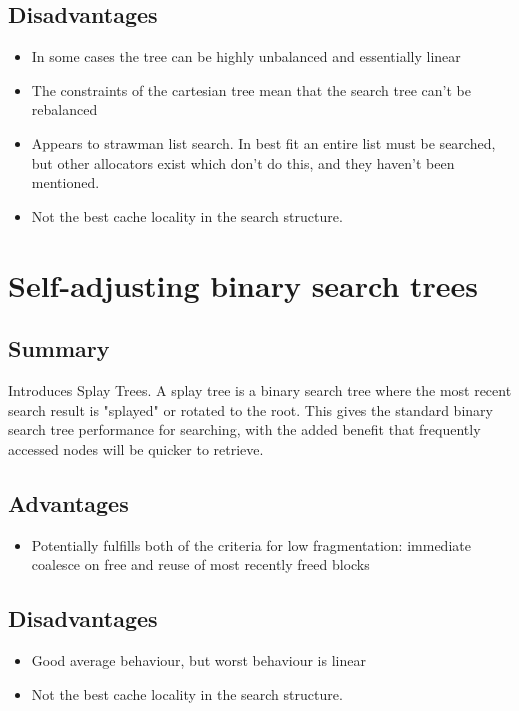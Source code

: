 \documentclass{report}
\begin{document}
\subsection{Disadvantages}
\begin{itemize}
	\item{In some cases the tree can be highly unbalanced and essentially linear}
	\item{The constraints of the cartesian tree mean that the search tree can't be rebalanced}
	\item{Appears to strawman list search. In best fit an entire list must be searched, but other allocators exist which don't do this, and they haven't been mentioned.}
	\item{Not the best cache locality in the search structure.}
\end{itemize}

\section[Splay Trees]{Self-adjusting binary search trees \cite{10.1145/3828.3835}}
\subsection{Summary}
Introduces Splay Trees. A splay tree is a binary search tree where the most recent search result is "splayed" or rotated to the root. This gives the standard binary search tree performance for searching, with the added benefit that frequently accessed nodes will be quicker to retrieve.
\subsection{Advantages}
\begin{itemize}
	\item{Potentially fulfills both of the criteria for low fragmentation: immediate coalesce on free and reuse of most recently freed blocks}
\end{itemize}

\subsection{Disadvantages}
\begin{itemize}
	\item{Good average behaviour, but worst behaviour is linear}
	\item{Not the best cache locality in the search structure.}
\end{itemize}

{}

\end{document}
